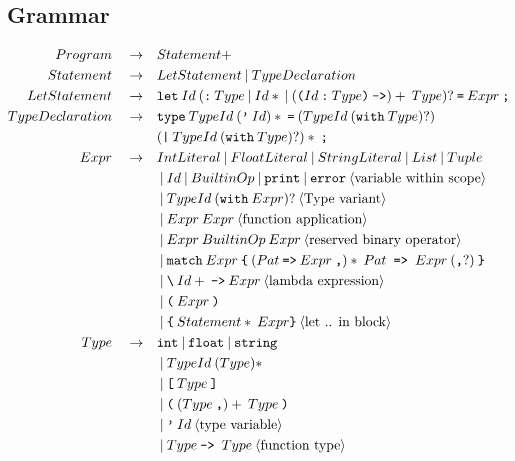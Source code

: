 \documentclass[a4paper, 12pt]{article}
\newcommand{\sepbar}{\: | \:}	%
\newcommand{\substo}{\quad\rightarrow\quad}
\begin{document}
\subsection{Grammar}
\begin{align*}
Program \substo& Statement+\\
Statement \substo& LetStatement \sepbar TypeDeclaration\\
LetStatement \substo& \texttt{let}\: Id \: (\texttt{:}\: Type\sepbar Id* \sepbar (\texttt{(}Id\: \texttt{:}\:Type\texttt{)}\:\texttt{->})+\:Type)?\:\texttt{=}\: Expr\:\texttt{;}\\
TypeDeclaration \substo& \texttt{type}\: TypeId\: (\texttt{'}\: Id)*\: \texttt{=} \: (TypeId \: (\texttt{with}\: Type)?)\\
&(\texttt{|}\:TypeId \: (\texttt{with}\: Type)?)*\:\texttt{;}\\
Expr\substo& IntLiteral \sepbar FloatLiteral \sepbar StringLiteral \sepbar List \sepbar Tuple\\
& \sepbar Id \sepbar BuiltinOp \sepbar \texttt{print} \sepbar \texttt{error}\:\langle\text{variable within scope}\rangle\\
& \sepbar TypeId\: (\texttt{with}\: Expr)?\: \langle\text{Type variant}\rangle\\
& \sepbar Expr\:Expr\:\langle\text{function application}\rangle\\
& \sepbar Expr \: BuiltinOp \: Expr\:\langle\text{reserved binary operator}\rangle \\
& \sepbar \texttt{match}\: Expr \: \texttt{\{} \: (Pat \: \texttt{=>}\: Expr\: \texttt{,})*\: Pat\texttt{ => } Expr \: (\texttt{,}?) \: \texttt{\}} \\
& \sepbar \texttt{\symbol{92}}\:Id+\: \texttt{->}\: Expr\:\langle\text{lambda expression}\rangle \\ 
& \sepbar \texttt{(}\: Expr \:\texttt{)}\\
& \sepbar \texttt{\{}\: Statement*\: Expr\texttt{\}} \:\langle \text{let .. in block}\rangle\\
Type \substo& \texttt{int} \sepbar \texttt{float} \sepbar \texttt{string}\\
& \sepbar TypeId\: (Type)*\\
& \sepbar \texttt{[}\:Type\:\texttt{]}\\
& \sepbar \texttt{(} \: (Type\: \texttt{,} )+\: Type\: \texttt{)}\\
& \sepbar \texttt{'}\:Id \: \langle\text{type variable}\rangle\\
& \sepbar Type \: \texttt{-> }Type\:\langle\text{function type}\rangle\\

\end{align*}
\end{document}
